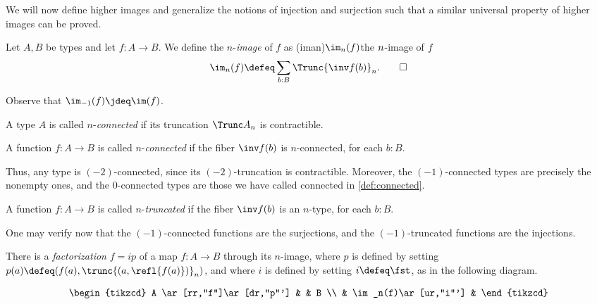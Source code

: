 We will now define higher images and generalize the notions
of injection and surjection such that a similar
universal property of higher images can be proved.

\begin{definition}\label{def:n-image}
  Let $A,B$ be types and let $f : A \to B$. We define the $n$-\emph{image} of $f$ as
  \glossary(iman){$\protect\im_n(f)$}{the $\protect n$-image of $\protect f$}
  \[
    \im_n(f) \defeq \sum_{b:B}\Trunc{\inv f (b)}_n.\qedhere
  \]
\end{definition}

Observe that $\im_{-1}(f) \jdeq \im(f)$.

\begin{definition}\label{def:n-connected}
  A type $A$ is called $n$-\emph{connected}
  if its truncation $\Trunc A _ n$ is contractible.

  A function $f : A \to B$ is called $n$-\emph{connected}
  if the fiber $\inv f (b)$ is $n$-connected, for each $b:B$.
\end{definition}

Thus, any type is $(-2)$-connected, since its $(-2)$-truncation is contractible.
Moreover, the $(-1)$-connected types are precisely the nonempty ones,
and the $0$-connected types are those we have called connected in \cref{def:connected}.

\begin{definition}\label{def:n-truncated}
  A function $f : A \to B$ is called $n$-\emph{truncated}
  if the fiber $\inv f (b)$ is an $n$-type, for each $b:B$.
\end{definition}

One may verify now that the $(-1)$-connected functions are the surjections, and
the $(-1)$-truncated functions are the injections.

There is a \emph{factorization} $f = i p$ of a map $f : A \to B$ through its $n$-image,
where $p$ is defined by setting $p(a)\defeq (f(a),\trunc{(a,\refl{f(a)})}_n)$,
and where $i$ is defined by setting $i\defeq\fst$, as in the following diagram.

\begin{equation}\label{eqn:n-image-factorization}
    \begin{tikzcd}
      A \ar[rr,"f"]\ar[dr,"p"'] & & B \\
      & \im_n(f)\ar[ur,"i"'] &
    \end{tikzcd}
\end{equation}

